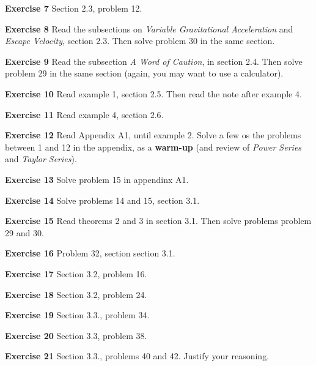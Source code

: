 \documentclass[12pt,oneside]{exam}
\newenvironment{exercise}[1]{\vspace{.1in}\noindent\textbf{Exercise #1 \hspace{.05em}}}{}
\begin{document}
\begin{exercise}{7}
Section 2.3, problem 12.
\end{exercise}

\begin{exercise}{8}
Read the subsections on \textit{Variable Gravitational Acceleration} and \textit{Escape Velocity}, section 2.3. Then solve problem 30 in the same section. 
\end{exercise}

\begin{exercise}{9}
Read the subsection \textit{A Word of Caution}, in section 2.4. Then solve problem 29 in the same section (again, you may want to use a calculator).
\end{exercise}

\begin{exercise}{10} 
Read example 1, section 2.5. Then read the note after example 4. 
\end{exercise}

\begin{exercise}{11}
Read example 4, section 2.6. 
\end{exercise}

\begin{exercise}{12} 
Read Appendix A1, until example 2. Solve a few os the problems between 1 and 12 in the appendix, as a \textbf{warm-up} (and review of \textit{Power Series} and \textit{Taylor Series}).
\end{exercise}

\begin{exercise}{13} 
Solve problem 15 in appendinx A1. 
\end{exercise}

\begin{exercise}{14}
Solve problems 14 and 15, section 3.1. 
\end{exercise}

\begin{exercise}{15}
Read theorems 2 and 3 in section 3.1. Then solve problems problem 29 and 30. 
\end{exercise}

\begin{exercise}{16}
Problem 32, section section 3.1.
\end{exercise}

\begin{exercise}{17}
Section 3.2, problem 16. 
\end{exercise}

\begin{exercise}{18} 
Section 3.2, problem 24. 
\end{exercise}

\begin{exercise}{19}
Section 3.3., problem 34.
\end{exercise}

\begin{exercise}{20}
Section 3.3, problem 38. 
\end{exercise}

\begin{exercise}{21}
Section 3.3., problems 40 and 42. Justify your reasoning. 
\end{exercise}
\end{document}
